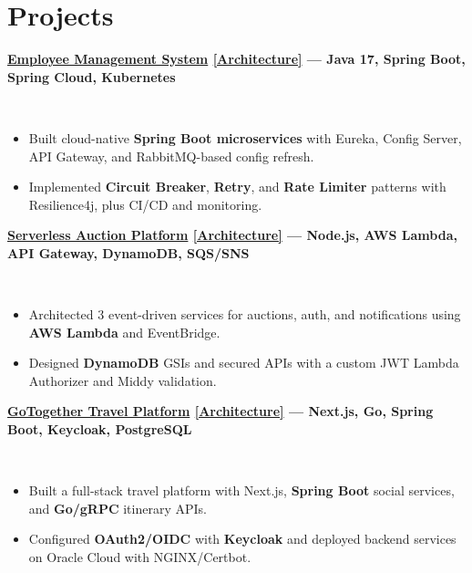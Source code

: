 \documentclass[a4paper,9pt]{extarticle}
\newcommand{\BigDivider}{}
\newcommand{\titleblock}[1]{%
  \begingroup
  \setlength{\fboxsep}{1pt}%
  \colorbox{BlockGray}{\strut\textbf{\textcolor{BlockText}{#1}}}%
  \endgroup
}
\newcommand{\kw}[1]{\textbf{#1}}
\newcommand{\skw}[1]{\textbf{#1}}
\newcommand{\cvprojectfull}[4]{%
  \noindent \titleblock{#1} \hfill {\scriptsize\textit{#2}} \\[0.15em]
  \begin{itemize}[leftmargin=*, itemsep=0pt, topsep=1pt, parsep=0pt]
    \item #3
    \item #4
  \end{itemize}
  \vspace{0.28em}
}
\begin{document}

\section*{Projects}
\BigDivider

\cvprojectfull
{\href{https://github.com/UchihaIthachi/EMS}{Employee Management System} {\scriptsize\href{https://UchihaIthachi.github.io/cv/arch/ems.png}{[Architecture]}} --- Java 17, Spring Boot, Spring Cloud, Kubernetes}
{}
{Built cloud-native \kw{Spring Boot microservices} with Eureka, Config Server, API Gateway, and RabbitMQ-based config refresh.}
{Implemented \skw{Circuit Breaker}, \skw{Retry}, and \skw{Rate Limiter} patterns with Resilience4j, plus CI/CD and monitoring.}

\cvprojectfull
{\href{https://github.com/UchihaIthachi/serverless-auction-platform}{Serverless Auction Platform} {\scriptsize\href{https://UchihaIthachi.github.io/cv/arch/serverless_auction.png}{[Architecture]}} --- Node.js, AWS Lambda, API Gateway, DynamoDB, SQS/SNS}
{}
{Architected 3 event-driven services for auctions, auth, and notifications using \kw{AWS Lambda} and EventBridge.}
{Designed \kw{DynamoDB} GSIs and secured APIs with a custom JWT Lambda Authorizer and Middy validation.}


\cvprojectfull
{\href{https://go-together-uom.vercel.app/}{GoTogether Travel Platform} {\scriptsize\href{https://UchihaIthachi.github.io/cv/arch/gotogether.png}{[Architecture]}} --- Next.js, Go, Spring Boot, Keycloak, PostgreSQL}
{}
{Built a full-stack travel platform with Next.js, \kw{Spring Boot} social services, and \kw{Go/gRPC} itinerary APIs.}
{Configured \kw{OAuth2/OIDC} with \kw{Keycloak} and deployed backend services on Oracle Cloud with NGINX/Certbot.}
\end{document}
